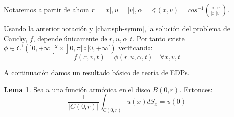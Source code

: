 \documentclass[a4paper,10pt]{scrartcl}
\theoremstyle{definition}
\newtheorem{lemma}{Lema}
\numberwithin{equation}{section}
\begin{document}
Notaremos a partir de ahora $r = |x|, u = |v|, \alpha = \sphericalangle(x,v) = cos^{-1}\left(\frac{x\cdot v}{|x||v|}\right)$. 

Usando la anterior notación y \cref{char:sph-symm}, la solución del problema de Cauchy, $f$, depende únicamente de $r, u, \alpha, t$. Por tanto existe $\phi \in C^1(]0,+\infty[^2\times ]0,\pi[ \times [0,+\infty[)$ verificando:
\begin{equation}
\label{eqn:f=phi}
f(x,v,t) = \phi(r,u,\alpha, t) \quad \forall x,v,t
\end{equation}

A continuación damos un resultado básico de teoría de EDPs.
\begin{lemma}
 Sea $u$ una función armónica en el disco $B(0,r)$. Entonces:
 \[
  \frac{1}{|C(0,r)|}\int_{C(0,r)} u(x) dS_x = u(0)
 \]
 \label{lemma:median-h}
\end{lemma}
\end{document}
